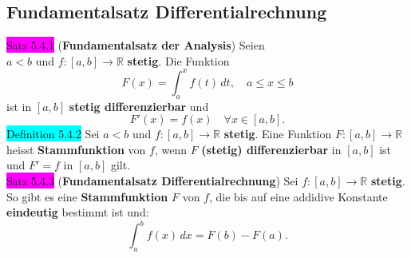 \documentclass[landscape, 10pt]{article}
\newcommand{\R}{\mathbb{R}}
\begin{document}
\begin{multicols}{3}
       \subsection{Fundamentalsatz Differentialrechnung}
              \colorbox{magenta}{Satz 5.4.1}
              (\textbf{Fundamentalsatz der Analysis}) 
                     Seien \\ \textcolor{NavyBlue}{$a<b$} und 
                     \textcolor{NavyBlue}{
                     $f:[a,b]\longrightarrow\R$} 
                     \textbf{stetig}. Die Funktion 
                     \begin{equation*}
                            F(x)=\int_a^xf(t)\,dt,
                            \quad a\leqslant x\leqslant b
                     \end{equation*}
                     ist in \textcolor{NavyBlue}{$[a,b]$} 
                     \textbf{stetig differenzierbar} 
                     und 
                     \begin{equation*}
                            F'(x)=f(x)\quad\forall x\in[a,b].
                     \end{equation*}
              \colorbox{cyan}{Definition 5.4.2} 
                     Sei \textcolor{NavyBlue}{$a<b$} und 
                     \textcolor{NavyBlue}{
                     $f:[a,b]\longrightarrow\R$} \textbf{stetig}. 
                     Eine Funktion 
                     \textcolor{NavyBlue}{
                     $F:[a,b]\longrightarrow\R$} heisst 
                     \textbf{Stammfunktion} von 
                     \textcolor{NavyBlue}{$f$}, wenn 
                     \textcolor{NavyBlue}{$F$} 
                     \textbf{(stetig) differenzierbar} in 
                     \textcolor{NavyBlue}{$[a,b]$}
                     ist und \textcolor{NavyBlue}{$F'=f$} in 
                     \textcolor{NavyBlue}{$[a,b]$} gilt.\\
              \colorbox{magenta}{Satz 5.4.3} 
              (\textbf{Fundamentalsatz Differentialrechnung}) 
                     Sei \textcolor{NavyBlue}{
                     $f:[a,b]\longrightarrow\R$} 
                     \textbf{stetig}. So gibt es eine 
                     \textbf{Stammfunktion} 
                     \textcolor{NavyBlue}{$F$} von 
                     \textcolor{NavyBlue}{$f$},
                     die bis auf eine addidive Konstante 
                     \textbf{eindeutig} bestimmt ist und: 
                     \begin{equation*}
                           \int_a^bf(x)\,dx=F(b)-F(a).

\end{equation*}
\end{multicols}
\end{document}
